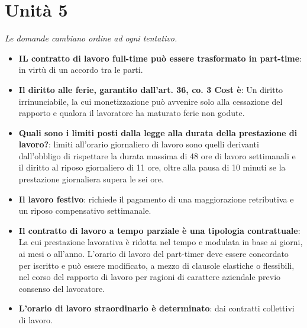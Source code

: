 \documentclass[12pt, a4paper]{report}
\begin{document}
\chapter{Unità 5}
    \textit{Le domande cambiano ordine ad ogni tentativo.}
    \begin{itemize}
        \item \textbf{IL contratto di lavoro full-time può essere trasformato in part-time}: in virtù di un accordo tra le parti.
        \item \textbf{Il diritto alle ferie, garantito dall’art. 36, co. 3 Cost è}: Un diritto irrinunciabile, la cui monetizzazione può avvenire solo alla cessazione del rapporto e qualora il lavoratore ha maturato ferie non godute.
        \item \textbf{Quali sono i limiti posti dalla legge alla durata della prestazione di lavoro?}: limiti all’orario giornaliero di lavoro sono quelli derivanti dall’obbligo di rispettare la durata massima di 48 ore di lavoro settimanali e il diritto al riposo giornaliero di 11 ore, oltre alla pausa di 10 minuti se la prestazione giornaliera supera le sei ore.
        \item \textbf{Il lavoro festivo}: richiede il pagamento di una maggiorazione retributiva e un riposo compensativo settimanale.
        \item \textbf{Il contratto di lavoro a tempo parziale è una tipologia contrattuale}: La cui prestazione lavorativa è ridotta nel tempo e modulata in base ai giorni, ai mesi o all’anno. L’orario di lavoro del part-timer deve essere concordato per iscritto e può essere modificato, a mezzo di clausole elastiche o flessibili, nel corso del rapporto di lavoro per ragioni di carattere aziendale previo consenso del lavoratore.
        \item \textbf{L’orario di lavoro straordinario è determinato}: dai contratti collettivi di lavoro.
    \end{itemize}
\end{document}
